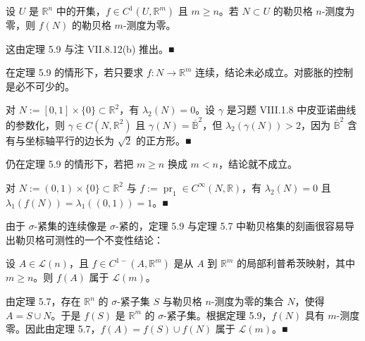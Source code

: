 \begin{corollary}

设 $ U $ 是 $ \mathbb{R}^n $ 中的开集，$ f \in C^1(U, \mathbb{R}^m) $ 且 $ m \ge n $。若 $ N \subset U $ 的勒贝格 $ n $-测度为零，则 $ f(N) $ 的勒贝格 $ m $-测度为零。

\proofhead
这由定理 5.9 与注 VII.8.12(b) 推出。\nobreak\hspace{0.35em}■
\end{corollary}

\begin{remark}

\begin{items}
\item

在定理 5.9 的情形下，若只要求 $ f: N \to \mathbb{R}^m $ 连续，结论未必成立。对膨胀的控制是必不可少的。

\proofhead
对 $ N := [0, 1] \times \{0\} \subset \mathbb{R}^2 $，有 $ \lambda_2(N) = 0 $。设 $ \gamma $ 是习题 VIII.1.8 中皮亚诺曲线的参数化，则 $ \gamma \in C(N, \mathbb{R}^2) $ 且 $ \gamma(N) = \overline{\mathbb{B}}^2 $，但 $ \lambda_2(\gamma(N)) > 2 $，因为 $ \overline{\mathbb{B}}^2 $ 含有与坐标轴平行的边长为 $ \sqrt{2} $ 的正方形。\nobreak\hspace{0.35em}■
\item

仍在定理 5.9 的情形下，若把 $ m \ge n $ 换成 $ m < n $，结论就不成立。

\proofhead
对 $ N := (0, 1) \times \{0\} \subset \mathbb{R}^2 $ 与 $ f := \operatorname{pr}_1 \in C^{\infty}(N, \mathbb{R}) $，有 $ \lambda_2(N) = 0 $ 且 $ \lambda_1(f(N)) = \lambda_1((0, 1)) = 1 $。\nobreak\hspace{0.35em}■
\end{items}

由于 $ \sigma $-紧集的连续像是 $ \sigma $-紧的，定理 5.9 与定理 5.7 中勒贝格集的刻画很容易导出勒贝格可测性的一个不变性结论：

\end{remark}

\begin{theorem}

设 $ A \in \mathcal{L}(n) $，且 $ f \in C^{1-}(A, \mathbb{R}^m) $ 是从 $ A $ 到 $ \mathbb{R}^m $ 的局部利普希茨映射，其中 $ m \ge n $。则 $ f(A) $ 属于 $ \mathcal{L}(m) $。

\proofhead
由定理 5.7，存在 $ \mathbb{R}^n $ 的 $ \sigma $-紧子集 $ S $ 与勒贝格 $ n $-测度为零的集合 $ N $，使得 $ A = S \cup N $。于是 $ f(S) $ 是 $ \mathbb{R}^m $ 的 $ \sigma $-紧子集。根据定理 5.9，$ f(N) $ 具有 $ m $-测度零。因此由定理 5.7，$ f(A) = f(S) \cup f(N) $ 属于 $ \mathcal{L}(m) $。\nobreak\hspace{0.35em}■
\end{theorem}

